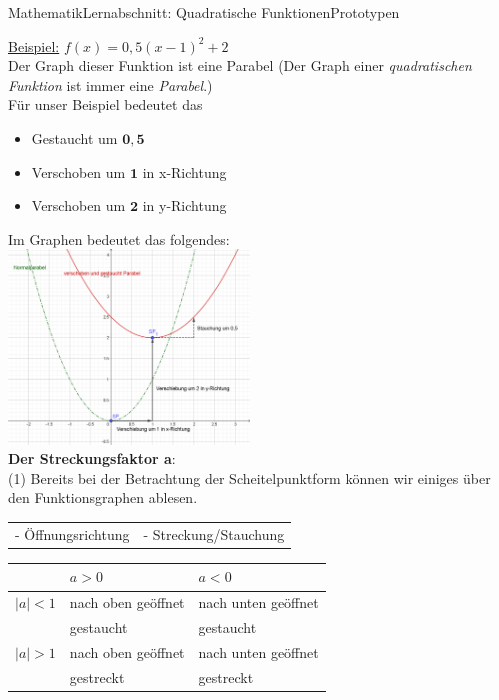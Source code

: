 \documentclass[11pt,twocolumn,oneside,openany,headings=optiontotoc,11pt,numbers=noenddot]{article}
\begin{document}
\begin{worksheet}{Mathematik}{Lernabschnitt: Quadratische Funktionen}{Prototypen}
		\par\noindent
		\underline{Beispiel:} \(f(x) = 0,5(x-1)^2 + 2\)\\
		Der Graph dieser Funktion ist eine Parabel (\small{Der Graph einer \textit{quadratischen Funktion} ist immer eine \textit{Parabel}.})\\
		Für unser Beispiel bedeutet das
		\begin{itemize}
			\item Gestaucht um \(\mathbf{0,5}\)
			\item Verschoben um \(\mathbf{1}\) in x-Richtung
			\item Verschoben um \(\mathbf{2}\) in y-Richtung
		\end{itemize}
		Im Graphen bedeutet das folgendes:\\
		\includegraphics[width=0.48\textwidth]{../99_Bilder/SP_Form.png}\\
		\textbf{Der Streckungsfaktor a}:\\
		(1) Bereits bei der Betrachtung der Scheitelpunktform können wir einiges über den Funktionsgraphen ablesen.\\
		\begin{tabularx}{0.5\textwidth}{XX}
			- Öffnungsrichtung & - Streckung/Stauchung
		\end{tabularx}
		\par\noindent
		\begin{tabularx}{0.5\textwidth}{l|l|l}
			\diagbox{\(|a|\)}{\(a\)} & \(a > 0\) & \( a < 0\)\\
			\hline
			\(|a| < 1\) & nach oben geöffnet & nach unten geöffnet\\
			& gestaucht & gestaucht\\
			\hline
			\(|a|> 1\) & nach oben geöffnet & nach unten geöffnet\\
			& gestreckt & gestreckt
		\end{tabularx}\\
		\par\bigskip\noindent
		\begin{tabularx}{0.5\textwidth}{XX}

\end{tabularx}
\end{worksheet}
\end{document}
